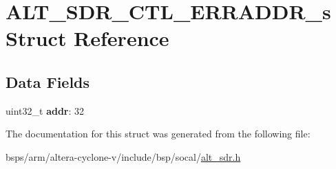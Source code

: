 \hypertarget{structALT__SDR__CTL__ERRADDR__s}{}\section{A\+L\+T\+\_\+\+S\+D\+R\+\_\+\+C\+T\+L\+\_\+\+E\+R\+R\+A\+D\+D\+R\+\_\+s Struct Reference}
\label{structALT__SDR__CTL__ERRADDR__s}
\subsection*{Data Fields}
\begin{DoxyCompactItemize}
\item 
\mbox{\label{structALT__SDR__CTL__ERRADDR__s_adf6b5544d5012ac36ce1b370f0214a8f}} 
uint32\+\_\+t {\bfseries addr}\+: 32
\end{DoxyCompactItemize}


The documentation for this struct was generated from the following file\+:\begin{DoxyCompactItemize}
\item 
bsps/arm/altera-\/cyclone-\/v/include/bsp/socal/\mbox{\hyperlink{alt__sdr_8h}{alt\+\_\+sdr.\+h}}\end{DoxyCompactItemize}
